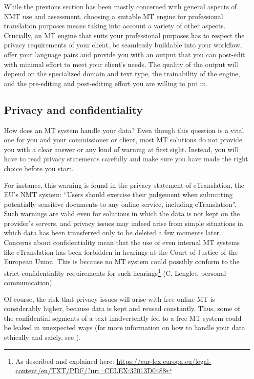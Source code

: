 \documentclass[output=paper]{langscibook}
\begin{document}
While the previous section has been mostly concerned with general aspects of NMT use and assessment, choosing a suitable MT engine for professional translation purposes means taking into account a variety of other aspects. Crucially, an MT engine that suits your professional purposes has to respect the privacy requirements of your client, be seamlessly buildable into your workflow, offer your language pairs and provide you with an output that you can post-edit with minimal effort to meet your client’s needs. The quality of the output will depend on the specialized domain and text type, the trainability of the engine, and the pre-editing and post-editing effort you are willing to put in.

\subsection{Privacy and confidentiality}

How does an MT system handle your data? Even though this question is a vital one for you and your commissioner or client, most MT solutions do not provide you with a clear answer or any kind of warning at first sight. Instead, you will have to read privacy statements carefully and make sure you have made the right choice before you start.

For instance, this warning is found in the privacy statement of eTranslation, the EU’s NMT system: “Users should exercise their judgement when submitting potentially sensitive documents to any online service, including eTranslation”. Such warnings are valid even for solutions in which the data is not kept on the provider’s servers, and privacy issues may indeed arise from simple situations in which data has been transferred only to be deleted a few moments later. Concerns about confidentiality mean that the use of even internal MT systems like eTranslation has been forbidden in hearings at the Court of Justice of the European Union. This is because no MT system could possibly conform to the strict confidentiality requirements for such hearings\footnote{As described and explained here: \url{https://eur-lex.europa.eu/legal-content/en/TXT/PDF/?uri=CELEX:32013D0488}} (C. Lenglet, personal communication).

Of course, the risk that privacy issues will arise with free online MT is considerably higher, because data is kept and reused constantly. Thus, some of the confidential segments of a text inadvertently fed to a free MT system could be leaked in unexpected ways (for more information on how to handle your data ethically and safely, see ).
\end{document}
